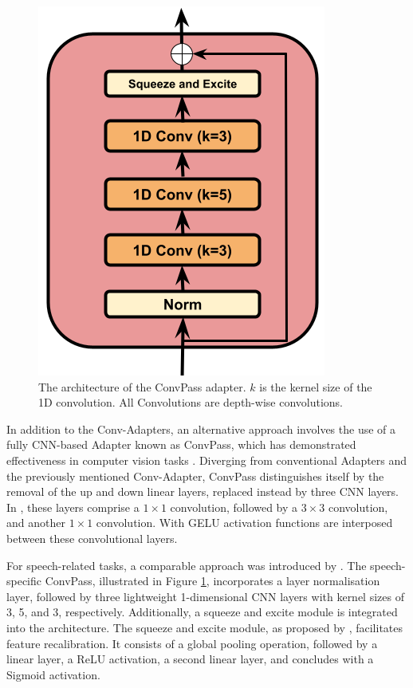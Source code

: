 \begin{figure}
    \begin{center}
        \includegraphics[scale=0.4]{imgs/ConvPass.png}
        \caption{The architecture of the ConvPass adapter. $k$ is the kernel size of the 1D convolution. All Convolutions are depth-wise convolutions.}
        \label{fig:convpass}
    \end{center}
\end{figure}

In addition to the Conv-Adapters, an alternative approach involves the use of a fully \ac{CNN}-based Adapter known as ConvPass, which has demonstrated effectiveness in computer vision tasks \cite{jie2022convolutional}. Diverging from conventional Adapters and the previously mentioned Conv-Adapter, ConvPass distinguishes itself by the removal of the up and down linear layers, replaced instead by three \ac{CNN} layers. In \cite{jie2022convolutional}, these layers comprise a $1 \times 1$ convolution, followed by a $3 \times 3$ convolution, and another $1 \times 1$ convolution. With \ac{GELU} activation functions are interposed between these convolutional layers.

For speech-related tasks, a comparable approach was introduced by \cite{li2023evaluating}. The speech-specific ConvPass, illustrated in Figure \ref{fig:convpass}, incorporates a layer normalisation layer, followed by three lightweight 1-dimensional \ac{CNN} layers with kernel sizes of 3, 5, and 3, respectively. Additionally, a squeeze and excite module is integrated into the architecture. The squeeze and excite module, as proposed by \cite{hu2018squeeze}, facilitates feature recalibration. It consists of a global pooling operation, followed by a linear layer, a \ac{ReLU} activation, a second linear layer, and concludes with a Sigmoid activation.

